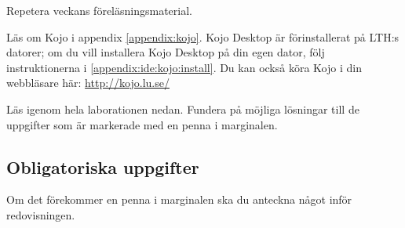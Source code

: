 
\Lab{\LabWeekONE}
%
\begin{Goals}

\end{Goals}

\begin{Preparations}
\item Repetera veckans föreläsningsmaterial.
\item {}%
\item Läs om Kojo i appendix \ref{appendix:kojo}. Kojo Desktop är förinstallerat på LTH:s datorer; om du vill installera Kojo Desktop på din egen dator, följ instruktionerna i \ref{appendix:ide:kojo:install}. Du kan också köra Kojo i din webbläsare här: \url{http://kojo.lu.se/}
\item Läs igenom hela laborationen nedan. Fundera på möjliga lösningar till de uppgifter som är markerade med en penna i marginalen.
\end{Preparations}

\subsection{Obligatoriska uppgifter}

Om det förekommer en penna i marginalen ska du anteckna något inför redovisningen.


